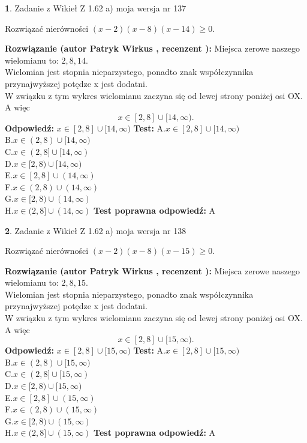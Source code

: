 \documentclass[12pt, a4paper]{article}
\theoremstyle{definition} %
\newtheorem{zad}{}
\newcommand{\zadStart}[1]{\begin{zad}#1\newline}
\newcommand{\zadStop}{\end{zad}}
\newcommand{\rozwStart}[2]{\noindent \textbf{Rozwiązanie (autor #1 , recenzent #2): }\newline}
\newcommand{\rozwStop}{\newline}
\newcommand{\odpStart}{\noindent \textbf{Odpowiedź:}\newline}
\newcommand{\odpStop}{\newline}
\newcommand{\testStart}{\noindent \textbf{Test:}\newline}
\newcommand{\testStop}{\newline}
\newcommand{\kluczStart}{\noindent \textbf{Test poprawna odpowiedź:}\newline}
\newcommand{\kluczStop}{\newline}
\begin{document}
\zadStart{Zadanie z Wikieł Z 1.62 a) moja wersja nr 137}

Rozwiązać nierówności $(x-2)(x-8)(x-14)\ge0$.
\zadStop
\rozwStart{Patryk Wirkus}{}
Miejsca zerowe naszego wielomianu to: $2, 8, 14$.\\
Wielomian jest stopnia nieparzystego, ponadto znak współczynnika przy\linebreak najwyższej potędze x jest dodatni.\\ W związku z tym wykres wielomianu zaczyna się od lewej strony poniżej osi OX. A więc $$x \in [2,8] \cup [14,\infty).$$
\rozwStop
\odpStart
$x \in [2,8] \cup [14,\infty)$
\odpStop
\testStart
A.$x \in [2,8] \cup [14,\infty)$\\
B.$x \in (2,8) \cup [14,\infty)$\\
C.$x \in (2,8] \cup [14,\infty)$\\
D.$x \in [2,8) \cup [14,\infty)$\\
E.$x \in [2,8] \cup (14,\infty)$\\
F.$x \in (2,8) \cup (14,\infty)$\\
G.$x \in [2,8) \cup (14,\infty)$\\
H.$x \in (2,8] \cup (14,\infty)$
\testStop
\kluczStart
A
\kluczStop



\zadStart{Zadanie z Wikieł Z 1.62 a) moja wersja nr 138}

Rozwiązać nierówności $(x-2)(x-8)(x-15)\ge0$.
\zadStop
\rozwStart{Patryk Wirkus}{}
Miejsca zerowe naszego wielomianu to: $2, 8, 15$.\\
Wielomian jest stopnia nieparzystego, ponadto znak współczynnika przy\linebreak najwyższej potędze x jest dodatni.\\ W związku z tym wykres wielomianu zaczyna się od lewej strony poniżej osi OX. A więc $$x \in [2,8] \cup [15,\infty).$$
\rozwStop
\odpStart
$x \in [2,8] \cup [15,\infty)$
\odpStop
\testStart
A.$x \in [2,8] \cup [15,\infty)$\\
B.$x \in (2,8) \cup [15,\infty)$\\
C.$x \in (2,8] \cup [15,\infty)$\\
D.$x \in [2,8) \cup [15,\infty)$\\
E.$x \in [2,8] \cup (15,\infty)$\\
F.$x \in (2,8) \cup (15,\infty)$\\
G.$x \in [2,8) \cup (15,\infty)$\\
H.$x \in (2,8] \cup (15,\infty)$
\testStop
\kluczStart
A
\kluczStop
\end{document}
